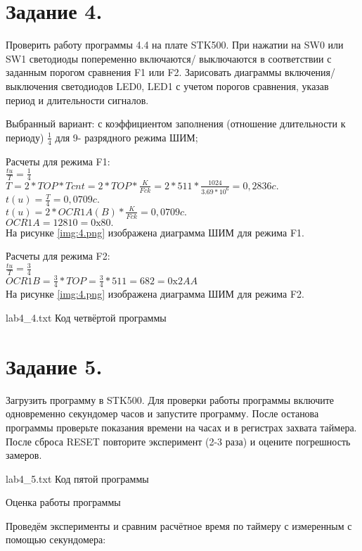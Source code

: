 \documentclass{bmstu}
\begin{document}
\chapter{Задание 4.}
Проверить работу программы 4.4 на плате STK500. При нажатии на SW0 или SW1 светодиоды попеременно включаются/
выключаются в соответствии с заданным порогом сравнения F1 или F2. Зарисовать диаграммы включения/выключения 
светодиодов LED0, LED1 с учетом порогов сравнения, указав период и длительности сигналов. 

Выбранный вариант: с коэффициентом заполнения (отношение длительности к периоду) $\frac{1}{4}$ для 9- разрядного режима ШИМ; 

Расчеты для режима F1: \\
$\frac{tu}{T} = \frac{1}{4} $ \\
$T = 2*TOP*Tcnt = 2*TOP* \frac{K}{Fck} = 2*511*\frac{1024}{3.69 * 10^6} = 0,2836c. $ \\
$t(u)=\frac{T}{4} = 0,0709c. $ \\
$t(u) = 2*OCR1A(B) *\frac{K}{Fck} = 0,0709c.$ \\
$OCR1A = 12810 = 0\text{x}80.$\\

На рисунке \ref{img:4.png} изображена диаграмма ШИМ для режима F1.

Расчеты для режима F2: \\
$\frac{tu}{T} = \frac{3}{4} $ \\ 
$OCR1B = \frac{3}{4} * TOP= \frac{3}{4} * 511 = 682 = 0 \text{x} 2AA $ \\

На рисунке \ref{img:4.png} изображена диаграмма ШИМ для режима F2.

	{lab4_4.txt}
	{Код четвёртой программы}

\chapter{Задание 5.} 
Загрузить программу в STK500. Для проверки работы программы включите одновременно секундомер часов и запустите 
программу. После останова программы проверьте показания времени на часах и в регистрах захвата таймера. После 
сброса RESET повторите эксперимент (2-3 раза) и оцените погрешность замеров. 

	{lab4_5.txt}
	{Код пятой программы}



Оценка работы программы 

Проведём эксперименты и сравним расчётное время по таймеру с измеренным с помощью секундомера:
\end{document}
